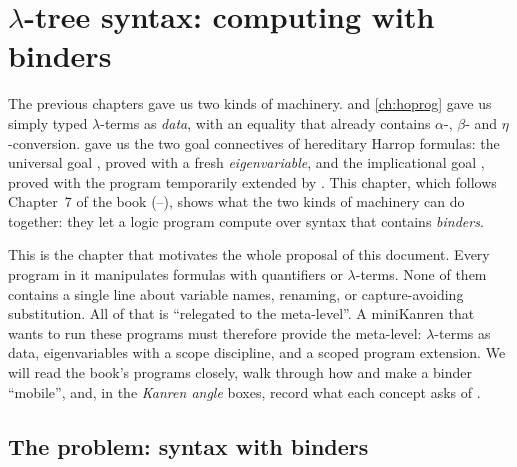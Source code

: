 \chapter{\texorpdfstring{$\lambda$}{λ}-tree syntax: computing with binders}\label{ch:lambdatree}

The previous chapters gave us two kinds of machinery.  and \cref{ch:hoprog} gave us
simply typed $\lambda$-terms as \emph{data}, with an equality that already contains $\alpha$-, $\beta$- and
$\eta$-conversion.  gave us the two goal connectives of hereditary Harrop formulas: the
universal goal , proved with a fresh \emph{eigenvariable}, and the implicational goal
, proved with the program temporarily extended by . This chapter, which follows Chapter~7 of
the book \cite{MillerNadathur2012} (--), shows what the two kinds of machinery can do
together: they let a logic program compute over syntax that contains \emph{binders}.

This is the chapter that motivates the whole proposal of this document. Every program in it
manipulates formulas with quantifiers or $\lambda$-terms. None of them contains a single line about variable
names, renaming, or capture-avoiding substitution. All of that is \enquote{relegated to the meta-level}.
A miniKanren that wants to run these programs must therefore provide the meta-level: $\lambda$-terms as data,
eigenvariables with a scope discipline, and a scoped program extension. We will read the book's programs
closely, walk through how  and \lp{=>} make a binder \enquote{mobile}, and, in the \emph{Kanren
angle} boxes, record what each concept asks of \micro.

\section{The problem: syntax with binders}\label{sec:lambdatree-problem}

